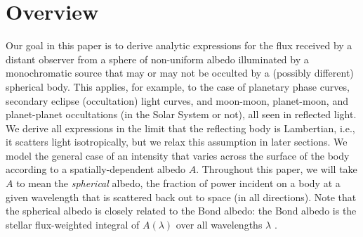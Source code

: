 \documentclass[modern]{aastex62}
\begin{document}
\section{Overview}
\label{sec:overview}

Our goal in this paper is to derive analytic expressions for the
flux received by a distant observer from a sphere of non-uniform albedo
illuminated by a monochromatic source that may or may not be
occulted by a (possibly different) spherical body. This applies, for example,
to the case of planetary phase curves, secondary
eclipse (occultation) light curves, and moon-moon, planet-moon, and
planet-planet occultations (in the Solar System or not),
all seen in reflected light. We derive all expressions in
the limit that the reflecting
body is Lambertian, i.e., it scatters light isotropically, but we relax
this assumption in later sections.
We model the general case of an
intensity that varies across the surface of the body according to a
spatially-dependent
albedo $A$. Throughout this paper, we will take $A$ to mean the \emph{spherical}
albedo, the fraction of power incident on a body at a given wavelength
that is scattered back out to space (in all directions).
Note that the spherical albedo
is closely related to the Bond albedo: the Bond albedo is the stellar
flux-weighted integral of $A(\lambda)$ over all wavelengths $\lambda$
\citep[see, e.g.,][]{Seager2010}.
\end{document}
